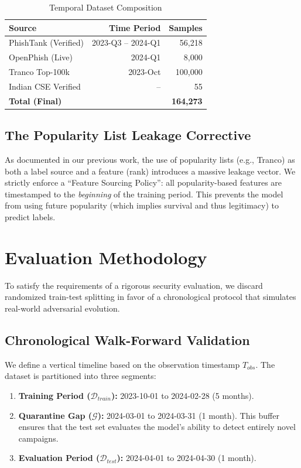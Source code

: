 \documentclass[journal]{IEEEtran}
\begin{document}
\begin{table}[h]
\centering
\caption{Temporal Dataset Composition}
\begin{tabular}{lrr}
\toprule
\textbf{Source} & \textbf{Time Period} & \textbf{Samples} \\
\midrule
PhishTank (Verified) & 2023-Q3 -- 2024-Q1 & 56,218 \\
OpenPhish (Live) & 2024-Q1 & 8,000 \\
Tranco Top-100k & 2023-Oct & 100,000 \\
Indian CSE Verified & -- & 55 \\
\midrule
\textbf{Total (Final)} & & \textbf{164,273} \\
\bottomrule
\end{tabular}
\end{table}

\subsection{The Popularity List Leakage Corrective}
As documented in our previous work, the use of popularity lists (e.g., Tranco) as both a label source and a feature (rank) introduces a massive leakage vector. We strictly enforce a ``Feature Sourcing Policy'': all popularity-based features are timestamped to the \textit{beginning} of the training period. This prevents the model from using future popularity (which implies survival and thus legitimacy) to predict labels.

\section{Evaluation Methodology}
To satisfy the requirements of a rigorous security evaluation, we discard randomized train-test splitting in favor of a chronological protocol that simulates real-world adversarial evolution.

\subsection{Chronological Walk-Forward Validation}
We define a vertical timeline based on the observation timestamp $T_{obs}$. The dataset is partitioned into three segments:
\begin{enumerate}
    \item \textbf{Training Period ($\mathcal{D}_{train}$):} 2023-10-01 to 2024-02-28 (5 months).
    \item \textbf{Quarantine Gap ($\mathcal{G}$):} 2024-03-01 to 2024-03-31 (1 month). This buffer ensures that the test set evaluates the model's ability to detect entirely novel campaigns.
    \item \textbf{Evaluation Period ($\mathcal{D}_{test}$):} 2024-04-01 to 2024-04-30 (1 month).
\end{enumerate}
\end{document}
